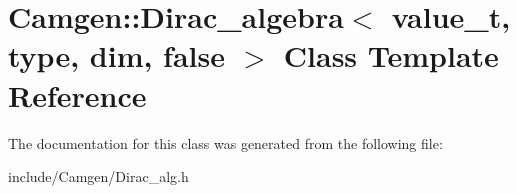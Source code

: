 \hypertarget{a00129}{\section{Camgen\-:\-:Dirac\-\_\-algebra$<$ value\-\_\-t, type, dim, false $>$ Class Template Reference}
\label{a00129}
}


The documentation for this class was generated from the following file\-:\begin{DoxyCompactItemize}
\item 
include/\-Camgen/Dirac\-\_\-alg.\-h\end{DoxyCompactItemize}
